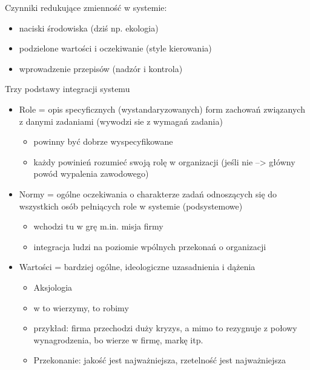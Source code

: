 \documentclass[a4paper,10pt]{report}
\begin{document}
Czynniki redukujące zmienność w systemie:
\begin{itemize}
	\item naciski środowiska (dziś np. ekologia)
	\item podzielone wartości i oczekiwanie (style kierowania)
	\item wprowadzenie przepisów (nadzór i kontrola)
\end{itemize}

Trzy podstawy integracji systemu
\begin{itemize}
	\item Role = opis specyficznych (wystandaryzowanych) form zachowań związanych z danymi zadaniami (wywodzi sie z wymagań zadania)
	\begin{itemize}
		\item powinny być dobrze wyspecyfikowane
		\item każdy powinień rozumieć swoją rolę w organizacji (jeśli nie --> główny powód wypalenia zawodowego)
	\end{itemize}
	\item Normy = ogólne oczekiwania o charakterze zadań odnoszących się do wszystkich osób pełniących role w systemie (podsystemowe)
	\begin{itemize}
		\item wchodzi tu w grę m.in. misja firmy
		\item integracja ludzi na poziomie wpólnych przekonań o organizacji
	\end{itemize}
	\item Wartości = bardziej ogólne, ideologiczne uzasadnienia i dążenia
	\begin{itemize}
		\item Aksjologia
		\item w to wierzymy, to robimy
		\item przykład: firma przechodzi duży kryzys, a mimo to rezygnuje z połowy wynagrodzenia, bo wierze w firmę, markę itp.
		\item Przekonanie: jakość jest najważniejsza, rzetelność jest najważniejsza
	\end{itemize}
\end{itemize}
\end{document}
